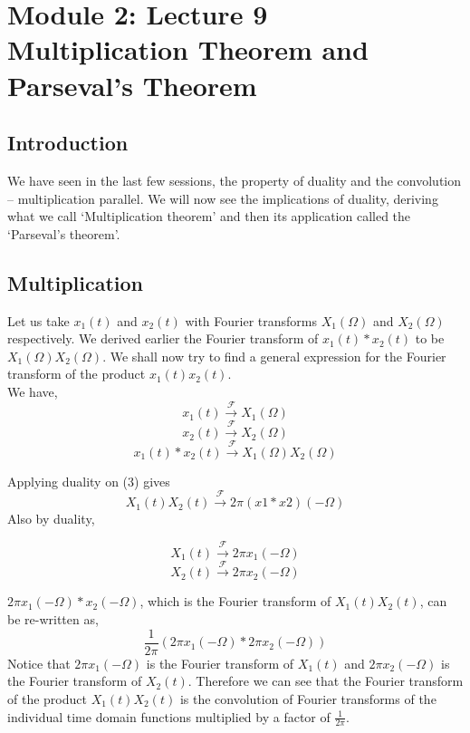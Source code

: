 \section{Module 2: Lecture 9\\Multiplication Theorem and Parseval's Theorem}


\subsection{Introduction}
We have seen in the last few sessions, the property of duality and the convolution – multiplication parallel. We will now see the implications of duality, deriving what we call ‘Multiplication theorem’ and then its application called the ‘Parseval’s theorem’.

\subsection{Multiplication}
Let us take $x_1(t)$ and $x_2(t)$ with Fourier transforms $X_1(\Omega)$ and $X_2(\Omega)$ respectively. We derived earlier the Fourier transform of $x_1(t) \ast x_2(t)$ to be $X_1(\Omega)X_2(\Omega)$. We shall now try to find a general expression for the Fourier transform of the product $x_1(t)x_2(t)$.
\\
We have,            
\begin{equation}
x_1(t)\xrightarrow{\mathcal{F}} X_1(\Omega)
\end{equation}
\begin{equation}
x_2(t) \xrightarrow{\mathcal{F}} X_2(\Omega)
\end{equation}
\begin{equation}
x_1(t) \ast x_2(t)\xrightarrow{\mathcal{F}} X_1(\Omega)X_2(\Omega)
\end{equation}

Applying duality on (3) gives
\[
X_1(t)X_2(t)
\xrightarrow{\mathcal{F}}
2\pi (x1 \ast x2)(-\Omega)
\]
Also by duality,

\[
X_1(t)
\xrightarrow{\mathcal{F}}
2 \pi x_1(-\Omega)
\]
\[
X_2(t)
\xrightarrow{\mathcal{F}}
2 \pi x_2(-\Omega)
\]

$2\pi x_1(-\Omega) \ast x_2(-\Omega)$, which is the Fourier transform of $X_1(t)X_2(t)$, can be re-written as,
\[
\frac{1}{2\pi} ( 2\pi x_1(-\Omega) * 2\pi x_2(-\Omega) )
\]
Notice that $2\pi x_1(-\Omega)$ is the Fourier transform of $X_1(t)$ and $2\pi x_2(-\Omega)$ is the Fourier transform of $X_2(t)$.
Therefore we can see that the Fourier transform of the product $X_1(t)X_2(t)$ is the convolution of Fourier transforms of the individual time domain functions multiplied by a factor of $\frac{1}{2\pi}$. 

